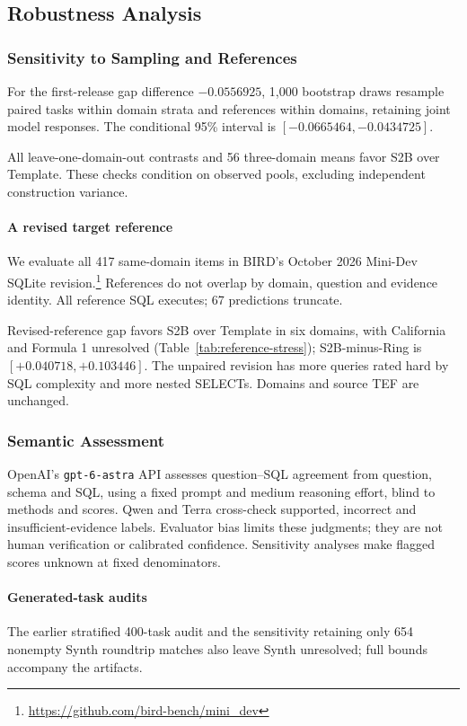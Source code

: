 \subsection{Robustness Analysis}\label{sec:robustness}
\subsubsection{Sensitivity to Sampling and References}\label{sec:precision}
For the first-release gap difference $-0.0556925$, 1,000 bootstrap draws resample paired tasks within domain strata and references within domains, retaining joint model responses. The conditional 95\% interval is $[-0.0665464,-0.0434725]$.

All leave-one-domain-out contrasts and 56 three-domain means favor S2B over Template. These checks condition on observed pools, excluding independent construction variance.

\paragraph{A revised target reference}
We evaluate all 417 same-domain items in BIRD's October 2026 Mini-Dev SQLite revision.\footnote{\url{https://github.com/bird-bench/mini_dev}} References do not overlap by domain, question and evidence identity. All reference SQL executes; 67 predictions truncate.

Revised-reference gap favors S2B over Template in six domains, with California and Formula 1 unresolved (Table~\ref{tab:reference-stress}); S2B-minus-Ring is $[+0.040718,+0.103446]$. The unpaired revision has more queries rated hard by SQL complexity and more nested SELECTs. Domains and source TEF are unchanged.

\subsubsection{Semantic Assessment}\label{sec:semantic}
OpenAI's \texttt{gpt-6-astra} API assesses question--SQL agreement \citep{zheng2023judge,liu2023geval} from question, schema and SQL, using a fixed prompt and medium reasoning effort, blind to methods and scores. Qwen and Terra cross-check supported, incorrect and insufficient-evidence labels. Evaluator bias \citep{wang2024faireval} limits these judgments; they are not human verification or calibrated confidence. Sensitivity analyses make flagged scores unknown at fixed denominators.

\paragraph{Generated-task audits}
The earlier stratified 400-task audit and the sensitivity retaining only 654 nonempty Synth roundtrip matches also leave Synth unresolved; full bounds accompany the artifacts.

